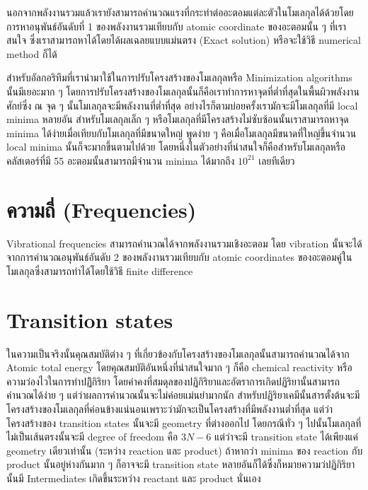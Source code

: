 นอกจากพลังงานรวมแล้วเรายังสามารถคำนวณแรงที่กระทำต่ออะตอมแต่ละตัวในโมเลกุลได้ด้วยโดยการหาอนุพันธ์อันดับที่ 1 
ของพลังงานรวมเทียบกับ atomic coordinate ของอะตอมนั้น ๆ ที่เราสนใจ ซึ่งเราสามารถหาได้โดยได้ผลเฉลยแบบแม่นตรง 
(Exact solution) หรือจะใช้วิธี numerical method ก็ได้

สำหรับอัลกอริทึมที่เรานำมาใช้ในการปรับโครงสร้างของโมเลกุลหรือ Minimization algorithms นั้นมีเยอะมาก ๆ 
โดยการปรับโครงสร้างของโมเลกุลนั้นก็คือเราทำการหาจุดที่ต่ำที่สุดในพื้นผิวพลังงานศักย์ซึ่ง 
ณ จุด ๆ นั้นโมเลกุลจะมีพลังงานที่ต่ำที่สุด อย่างไรก็ตามบ่อยครั้งเรามักจะมีโมเลกุลที่มี local minima หลายอัน 
สำหรับโมเลกุลเล็ก ๆ หรือโมเลกุลที่มีโครงสร้างไม่ซับซ้อนนั้นเราสามารถหาจุด minima 
ได้ง่ายเมื่อเทียบกับโมเลกุลที่มีขนาดใหญ่ พูดง่าย ๆ คือเมื่อโมเลกุลมีขนาดที่ใหญ่ขึ้นจำนวน local minima 
นั้นก็จะมากขึ้นตามไปด้วย โดยหนึ่งในตัวอย่างที่น่าสนใจก็คือสำหรับโมเลกุลหรือคลัสเตอร์ที่มี 55 อะตอมนั้นสามารถมีจำนวน 
minima ได้มากถึง $10^{21}$ เลยทีเดียว

\section{ความถี่ (Frequencies)}

Vibrational frequencies สามารถคำนวณได้จากพลังงานรวมเชิงอะตอม โดย vibration 
นั้นจะได้จากการคำนวณอนุพันธ์อันดับ 2 ของพลังงานรวมเทียบกับ atomic coordinates 
ของอะตอมคู่ในโมเลกุลซึ่งสามารถทำได้โดยใช้วิธี finite difference 

\section{Transition states}

ในความเป็นจริงนั้นคุณสมบัติต่าง ๆ ที่เกี่ยวข้องกับโครงสร้างของโมเลกุลนั้นสามารถคำนวณได้จาก Atomic total energy 
โดยคุณสมบัติอันหนึ่งที่น่าสนใจมาก ๆ ก็คือ chemical reactivity หรือความว่องไวในการทำปฏิิกิริยา 
โดยค่าคงที่สมดุลของปฏิกิริยาและอัตราการเกิดปฏิริยานั้นสามารถคำนวณได้ง่าย ๆ แต่ว่าผลการคำนวณนั้นจะไม่ค่อยแม่นยำมากนัก 
สำหรับปฏิริยาเคมีนั้นสารตั้งต้นจะมีโครงสร้างของโมเลกุลที่ค่อนข้างแน่นอนเพราะว่ามักจะเป็นโครงสร้างที่มีพลังงานต่ำที่สุด 
แต่ว่าโครงสร้างของ transition states นั้นจะมี geometry ที่ต่างออกไป โดยกรณีทั่ว ๆ ไปนั้นโมเลกุลที่ไม่เป็นเส้นตรงนั้นจะมี 
degree of freedom คือ $3N - 6$ แต่ว่าจะมี transition state ได้เพียงแค่ geometry เดียวเท่านั้น 
(ระหว่าง reaction และ product) ถ้าหากว่า minima ของ reaction กับ product นั้นอยู่ห่างกันมาก ๆ 
ก็อาจจะมี transition state หลายอันก็ได้ซึ่งก็หมายความว่ปฏิกิริยานั้นมี Intermediates เกิดขึ้นระหว่าง 
reactant และ product นั่นเอง 

